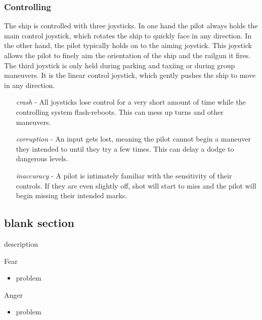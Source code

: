 \documentclass[a4paper]{article}
\begin{document}
\vspace{-0.5cm} \hspace{-18pt} \subsubsection{Controlling} \label{fighter_controlling} \vspace{-0.2cm}
The ship is controlled with three joysticks. In one hand the pilot always holds the main control joystick, which rotates the ship to quickly face in any direction. In the other hand, the pilot typically holds on to the aiming joystick. This joystick allows the pilot to finely aim the orientation of the ship and the railgun it fires. The third joystick is only held during parking and taxiing or during group maneuvers. It is the linear control joystick, which gently pushes the ship to move in any direction.
\begin{enumerate}[leftmargin=2cm]
\item [\textit{crash}] - All joysticks lose control for a very short amount of time while the controlling system flash-reboots. This can mess up turns and other maneuvers.
\item [\textit{corruption}] - An input gets lost, meaning the pilot cannot begin a maneuver they intended to until they try a few times. This can delay a dodge to dangerous levels.
\item [\textit{inaccuracy}] - A pilot is intimately familiar with the sensitivity of their controls. If they are even slightly off, shot will start to miss and the pilot will begin missing their intended marks.
\end{enumerate}












\subsection{blank section} \label{blank}

description

\vspace{0.3cm}
\begin{minipage}[t]{0.4\linewidth}
Fear
\begin{itemize}
\item problem
\end{itemize}
\end{minipage} 
\begin{minipage}[t]{0.4\linewidth}
Anger
\begin{itemize}
\item problem
\end{itemize}
\end{minipage}
\end{document}
